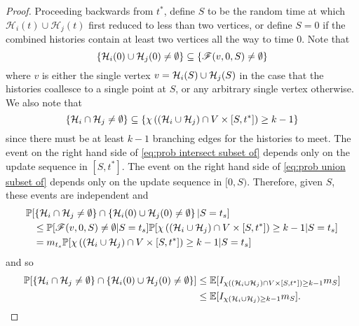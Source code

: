 \begin{proof}
		Proceeding backwards from $t^*$, define $S$ to be the random time at which $\mathcal{H}_i(t) \cup \mathcal{H}_j(t)$ first reduced to less than two vertices, or define $S = 0$ if the combined histories contain at least two vertices all the way to time $0$. 
		Note that
		\begin{equation}
			\label{eq:prob union subset of}
			\{\mathcal{H}_i(0) \cup \mathcal{H}_j(0) \neq \emptyset\} \subseteq \{\mathscr{F}(v, 0, S) \neq \emptyset\}
		\end{equation}
		where $v$ is either the single vertex $v = \mathcal{H}_i(S) \cup\mathcal{H}_j(S)$ in the case that the histories coallesce to a single point at $S$, or any arbitrary single vertex otherwise.
		We also note that
		\begin{equation}
			\label{eq:prob intersect subset of}
			\{\mathcal{H}_i \cap \mathcal{H}_j \neq \emptyset\} \subseteq \{\chi\left((\mathcal{H}_i \cup \mathcal{H}_j)\cap V \times [S, t^*]\right) \geq k - 1\}
		\end{equation}
		since there must be at least $k - 1$ branching edges for the histories to meet. The event on the right hand side of \eqref{eq:prob intersect subset of} depends only on the update sequence in $[S, t^*]$. The event on the right hand side of \eqref{eq:prob union subset of} depends only on the update sequence in $[0, S)$. Therefore, given $S$, these events are independent and
		\begin{align}
			&\mathbb{P}[\left\{\mathcal{H}_i \cap \mathcal{H}_j \neq \emptyset\right\} \cap \left\{\mathcal{H}_i(0) \cup \mathcal{H}_j(0) \neq \emptyset\right\}| S = t_s] \notag \\
			&\phantom{=}\leq \mathbb{P}[\mathscr{F}(v, 0, S) \neq \emptyset | S = t_s] \mathbb{P}[\chi\left((\mathcal{H}_i \cup \mathcal{H}_j)\cap V \times [S, t^*]\right) \geq k - 1 | S = t_s]\\
			&\phantom{=}= m_{t_s}  \mathbb{P}[\chi\left((\mathcal{H}_i \cup \mathcal{H}_j)\cap V \times [S, t^*]\right) \geq k - 1 | S = t_s]
		\end{align}
		and so
		\begin{align}
			\mathbb{P}[\left\{\mathcal{H}_i \cap \mathcal{H}_j \neq \emptyset\right\} \cap \left\{\mathcal{H}_i(0) \cup \mathcal{H}_j(0) \neq \emptyset\right\}] &\leq \mathbb{E}[I_{\chi\left((\mathcal{H}_i \cup \mathcal{H}_j)\cap V \times [S, t^*]\right) \geq k - 1 }m_S]\\
			&\leq \mathbb{E}[I_{\chi(\mathcal{H}_i \cup \mathcal{H}_j) \geq k - 1} m_S].
		\end{align}

\end{proof}
